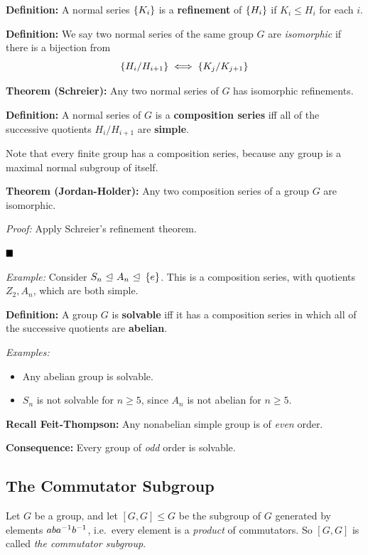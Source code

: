 \textbf{Definition:} A normal series \(\left\{{K_i}\right\}\) is a
\textbf{refinement} of \(\left\{{H_i}\right\}\) if \(K_i \leq H_i\) for each
\(i\).

\textbf{Definition:} We say two normal series of the same group \(G\)
are \emph{isomorphic} if there is a bijection from \[
\left\{{H_i / H_{i+1}}\right\} \iff \left\{{K_j / K_{j+1}}\right\}
\]

\textbf{Theorem (Schreier):} Any two normal series of \(G\) has
isomorphic refinements.

\textbf{Definition:} A normal series of \(G\) is a \textbf{composition
series} iff all of the successive quotients \(H_i / H_{i+1}\) are
\textbf{simple}.

Note that every finite group has a composition series, because any group
is a maximal normal subgroup of itself.

\textbf{Theorem (Jordan-Holder):} Any two composition series of a group
\(G\) are isomorphic.

\emph{Proof:} Apply Schreier's refinement theorem.

\(\qed\)

\emph{Example:} Consider \(S_n {~\trianglelefteq~} A_n {~\trianglelefteq~} \left\{{e}\right\}\). This is
a composition series, with quotients \(Z_2, A_n\), which are both
simple.

\textbf{Definition:} A group \(G\) is \textbf{solvable} iff it has a
composition series in which all of the successive quotients are
\textbf{abelian}.

\emph{Examples:}

\begin{itemize}
\item
  Any abelian group is solvable.
\item
  \(S_n\) is not solvable for \(n\geq 5\), since \(A_n\) is not abelian
  for \(n\geq 5\).
\end{itemize}

\textbf{Recall Feit-Thompson:} Any nonabelian simple group is of
\emph{even} order.

\textbf{Consequence:} Every group of \emph{odd} order is solvable.

\hypertarget{the-commutator-subgroup}{%
\subsection{The Commutator Subgroup}\label{the-commutator-subgroup}}

Let \(G\) be a group, and let \([G, G] \leq G\) be the subgroup of \(G\)
generated by elements \(aba^{-1} b^{-1}\), i.e.~every element is a
\emph{product} of commutators. So \([G, G]\) is called \emph{the
commutator subgroup}.

